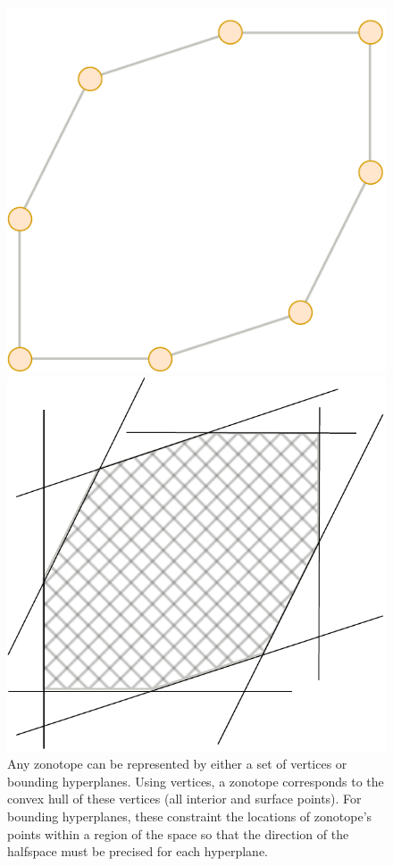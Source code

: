 \begin{figure}[!htb]
    \captionsetup{justification=centering}
    \begin{minipage}{0.49\linewidth}
        \centering
        \includegraphics[trim={0 0 0 0},clip, width=0.6\linewidth]{img/chapter_2/zonotope_vertices.pdf}
    \end{minipage}
    \hfill
    \begin{minipage}{0.49\linewidth}
        \centering
        \includegraphics[trim={0 0 0 0},clip,width=0.75\linewidth]{img/chapter_2/zonotope_hyperplanes.pdf}
    \end{minipage}
    \caption{Any zonotope can be represented by either a set of vertices or bounding hyperplanes. Using vertices, a zonotope corresponds to the convex hull of these vertices (all interior and surface points). For bounding hyperplanes, these constraint the locations of zonotope's points within a region of the space so that the direction of the halfspace must be precised for each hyperplane.}
    \label{fig:zonotope_vertices_hyperplanes}
\end{figure}

